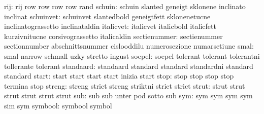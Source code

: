                       rij: rij                       row
                           row                       row
                           row                       rand
                   schuin: schuin                    slanted
                           geneigt                   sklonene
                           inclinato                 inclinat
                schuinvet: schuinvet                 slantedbold
                           geneigtfett               sklonenetucne
                           inclinatograssetto        inclinataldin
                italicvet: italicvet                 italicbold
                           italicfett                kurzivnitucne
                           corsivograssetto          italicaldin
             sectienummer: sectienummer              sectionnumber
                           abschnittsnummer          cislooddilu
                           numerosezione             numarsetiune
                     smal: smal                      narrow
                           schmall                   uzky
                           stretto                   ingust
                   soepel: soepel                    tolerant
                           tolerant                  tolerantni
                           tollerante                tolerant
                standaard: standaard                 standard
                           standard                  standardni
                           standard                  standard
                    start: start                     start
                           start                     start
                           inizia                    start
                     stop: stop                      stop
                           stop                      stop
                           termina                   stop
                   streng: streng                    strict
                           streng                    striktni
                           strict                    strict
                    strut: strut                     strut
                           strut                     strut
                           strut                     strut
                      sub: sub                       sub
                           unter                     pod
                           sotto                     sub
                      sym: sym                       sym
                           sym                       sym
                           sim                       sym
                  symbool: symbool                   symbol
